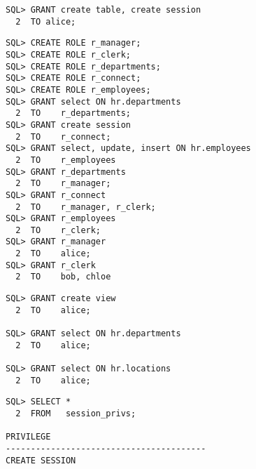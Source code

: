\begin{enumerate}
\begin{lstlisting}[language=oracle_sql]
SQL> GRANT create table, create session
  2  TO alice;
      \end{lstlisting}
    
      \begin{lstlisting}[language=oracle_sql]
SQL> CREATE ROLE r_manager;
SQL> CREATE ROLE r_clerk;
SQL> CREATE ROLE r_departments;
SQL> CREATE ROLE r_connect;
SQL> CREATE ROLE r_employees;
SQL> GRANT select ON hr.departments
  2  TO    r_departments;
SQL> GRANT create session
  2  TO    r_connect;
SQL> GRANT select, update, insert ON hr.employees
  2  TO    r_employees
SQL> GRANT r_departments
  2  TO    r_manager;
SQL> GRANT r_connect
  2  TO    r_manager, r_clerk;
SQL> GRANT r_employees
  2  TO    r_clerk;
SQL> GRANT r_manager
  2  TO    alice;
SQL> GRANT r_clerk
  2  TO    bob, chloe
      \end{lstlisting}
    
    \begin{lstlisting}[language=oracle_sql]
SQL> GRANT create view
  2  TO    alice;

SQL> GRANT select ON hr.departments
  2  TO    alice;

SQL> GRANT select ON hr.locations
  2  TO    alice;
    \end{lstlisting}
\clearpage
    
      \begin{lstlisting}[language=oracle_sql]
SQL> SELECT *
  2  FROM   session_privs;

PRIVILEGE
----------------------------------------
CREATE SESSION
      \end{lstlisting}
  \end{enumerate}
